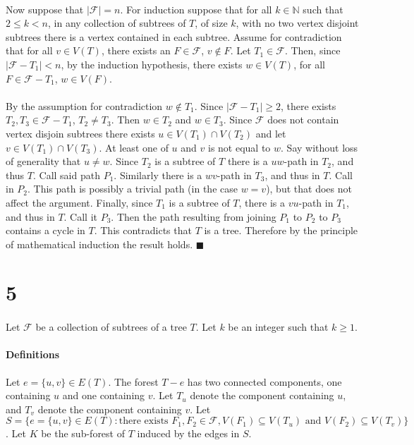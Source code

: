 \documentclass[letterpaper,12pt,oneside,onecolumn]{report}
\begin{document}
\paragraph{}
Now suppose that $|\mathcal{F}| = n$. For induction suppose that for all $k \in \mathbb{N}$ such that $2 \leq k < n$, in any collection of subtrees of $T$, of size $k$, with no two vertex disjoint subtrees there is a vertex contained in each subtree. Assume for contradiction that for all $v \in V(T)$, there exists an $F \in \mathcal{F}$, $v \not\in F$. Let $T_1 \in \mathcal{F}$. Then, since $|\mathcal{F} - T_1| < n$, by the induction hypothesis, there exists $w \in V(T)$, for all $F \in \mathcal{F} - T_1$, $w \in V(F)$.
\paragraph{}
 By the assumption for contradiction $w \not\in T_1$. Since $|\mathcal{F} - T_1| \geq 2$, there exists $T_2, T_3 \in \mathcal{F} - T_1$, $T_2 \neq T_3$. Then $w \in T_2$ and $w \in T_3$. Since $\mathcal{F}$ does not contain vertex disjoin subtrees there exists $u \in V(T_1) \cap V(T_2)$ and let $v \in V(T_1) \cap V(T_3)$. At least one of $u$ and $v$ is not equal to $w$. Say without loss of generality that $u \neq w$. Since $T_2$ is a subtree of $T$ there is a $uw$-path in $T_2$, and thus $T$. Call said path $P_1$. Similarly there is a $wv$-path in $T_3$, and thus in $T$. Call in $P_2$. This path is possibly a trivial path (in the case $w=v$), but that does not affect the argument. Finally, since $T_1$ is a subtree of $T$, there is a $vu$-path in $T_1$, and thus in $T$. Call it $P_3$. Then the path resulting from joining $P_1$ to $P_2$ to $P_3$ contains a cycle in $T$. This contradicts that $T$ is a tree. Therefore by the principle of mathematical induction the result holds. $\blacksquare$
\section*{5}
\paragraph{}
Let $\mathcal{F}$ be a collection of subtrees of a tree $T$. Let $k$ be an integer such that $k \geq 1$.
\paragraph{Definitions}
Let $e=\{u,v\} \in E(T)$. The forest $T-e$ has two connected components, one containing $u$ and one containing $v$. Let $T_u$ denote the component containing $u$, and $T_v$ denote the component containing $v$. Let $S = \{e=\{u,v\} \in E(T) : \text{there exists } F_1,F_2 \in \mathcal{F}, V(F_1) \subseteq V(T_u) \text{ and } V(F_2) \subseteq V(T_v)\}$. Let $K$ be the sub-forest of $T$ induced by the edges in $S$.
\end{document}
